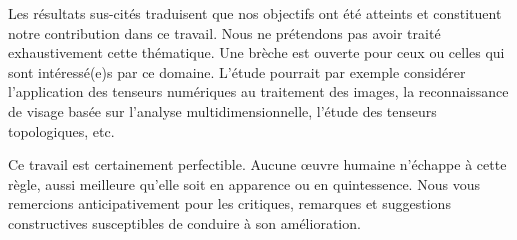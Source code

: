 \documentclass[11pt,a4paper,oneside]{book}
\begin{document}
{\par Les résultats sus-cités traduisent que nos objectifs ont été atteints et constituent notre contribution dans ce travail. Nous ne prétendons
pas avoir traité exhaustivement cette thématique. Une brèche est ouverte
pour ceux ou celles qui sont intéressé(e)s par ce domaine. L'étude pourrait
par exemple considérer l'application des tenseurs numériques au traitement  des images, la reconnaissance de visage basée sur l’analyse multidimensionnelle, l'étude des tenseurs topologiques, etc.
\par Ce travail  est certainement perfectible. Aucune œuvre humaine n’échappe
à cette règle, aussi meilleure qu’elle soit en apparence ou en quintessence. Nous vous
remercions anticipativement pour les critiques, remarques et suggestions constructives susceptibles de conduire à son amélioration.



}





	
	
	
	





\nocite{*}

\end{document}
